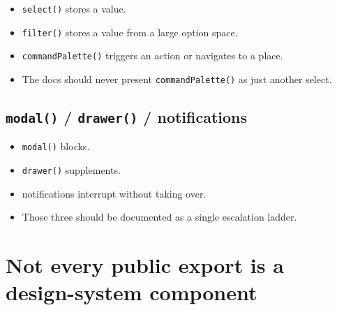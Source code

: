 \begin{itemize}
\tightlist
\item
  \texttt{s\allowbreak{}e\allowbreak{}l\allowbreak{}e\allowbreak{}c\allowbreak{}t\allowbreak{}(\allowbreak{})} stores a value.
\item
  \texttt{f\allowbreak{}i\allowbreak{}l\allowbreak{}t\allowbreak{}e\allowbreak{}r\allowbreak{}(\allowbreak{})} stores a value from a large option space.
\item
  \texttt{c\allowbreak{}o\allowbreak{}m\allowbreak{}m\allowbreak{}a\allowbreak{}n\allowbreak{}d\allowbreak{}P\allowbreak{}a\allowbreak{}l\allowbreak{}e\allowbreak{}t\allowbreak{}t\allowbreak{}e\allowbreak{}(\allowbreak{})} triggers an action or navigates to a place.
\item
  The docs should never present \texttt{c\allowbreak{}o\allowbreak{}m\allowbreak{}m\allowbreak{}a\allowbreak{}n\allowbreak{}d\allowbreak{}P\allowbreak{}a\allowbreak{}l\allowbreak{}e\allowbreak{}t\allowbreak{}t\allowbreak{}e\allowbreak{}(\allowbreak{})} as just another select.
\end{itemize}

\subsection{\texorpdfstring{\texttt{m\allowbreak{}o\allowbreak{}d\allowbreak{}a\allowbreak{}l\allowbreak{}(\allowbreak{})} / \texttt{d\allowbreak{}r\allowbreak{}a\allowbreak{}w\allowbreak{}e\allowbreak{}r\allowbreak{}(\allowbreak{})} / notifications}{ /  / notifications}}\label{record-425-modal-drawer-notifications}

\begin{itemize}
\tightlist
\item
  \texttt{m\allowbreak{}o\allowbreak{}d\allowbreak{}a\allowbreak{}l\allowbreak{}(\allowbreak{})} blocks.
\item
  \texttt{d\allowbreak{}r\allowbreak{}a\allowbreak{}w\allowbreak{}e\allowbreak{}r\allowbreak{}(\allowbreak{})} supplements.
\item
  notifications interrupt without taking over.
\item
  Those three should be documented as a single escalation ladder.
\end{itemize}

\section{Not every public export is a design-system component}\label{record-425-not-every-public-export-is-a-design-system-component}

